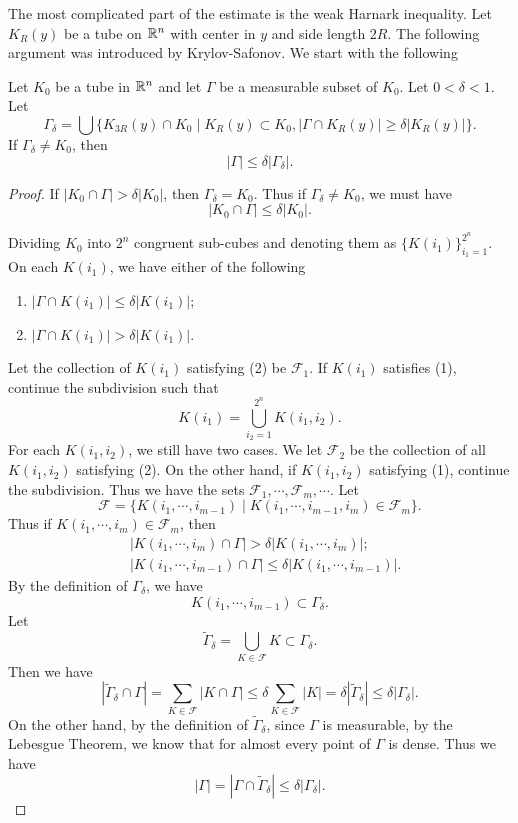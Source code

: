 The most complicated part of the estimate is the weak Harnark inequality. Let $K_R(y)$ be a tube on $\mathbb R^n$ with center in $y$ and side length $2R$. 
The following argument was introduced by Krylov-Safonov. We start  with the following




\begin{lemma}\label{20} Let $K_0$ be a tube in $\mathbb R^n$ and let $\Gamma$ be a measurable subset of $K_0$. Let $0<\delta<1$. Let
\[
\Gamma_\delta=\bigcup\{ K_{3R}(y)\cap K_0\mid K_R(y)\subset K_0, |\Gamma\cap K_R(y)|\geq\delta|K_R(y)|\}.
\]
If $\Gamma_\delta\neq K_0$, then
\[
|\Gamma|\leq\delta|\Gamma_\delta|.
\]
\end{lemma}

\begin{proof} If $|K_0\cap \Gamma|>\delta|K_0|$, then $\Gamma_\delta=K_0$. Thus if $\Gamma_\delta\neq K_0$, we must have
\[
|K_0\cap\Gamma|\leq\delta|K_0|.
\]

Dividing $K_0$ into $2^n$ congruent sub-cubes and denoting them as $\{K(i_1)\}_{i_1=1}^{2^n}$. On each $K(i_1)$, we have either of the following
\begin{enumerate}
\item $|\Gamma\cap K(i_1)|\leq\delta|K(i_1)|$;
\item $|\Gamma\cap K(i_1)|>\delta|K(i_1)|$.
\end{enumerate}
Let the collection of $K(i_1)$ satisfying (2) be $\mathcal F_1$. If $K(i_1)$ satisfies (1), continue the subdivision such that
\[
K(i_1)=\bigcup_{i_2=1}^{2^n}K(i_1,i_2).
\]
For each $K(i_1,i_2)$, we still have two cases. We let $\mathcal F_2$ be the collection of all $K(i_1,i_2)$ satisfying (2). On the other hand, if $K(i_1,i_2)$ satisfying (1), continue the subdivision. Thus we have the sets $\mathcal F_1,\cdots,\mathcal F_m,\cdots $. Let
\[
\mathcal F=\{K(i_1,\cdots,i_{m-1})\mid K(i_1,\cdots,i_{m-1}, i_m)\in\mathcal F_m\}.
\]
Thus if $K(i_1,\cdots,i_m)\in\mathcal F_m$, then
\begin{align*}
& |K(i_1,\cdots,i_m)\cap\Gamma|>\delta|K(i_1,\cdots,i_m)|;\\
&|K(i_1,\cdots,i_{m-1})\cap\Gamma|\leq \delta |K(i_1,\cdots,i_{m-1})|.
\end{align*}
By the definition of $\Gamma_\delta$, we have
\[
K(i_1,\cdots,i_{m-1})\subset\Gamma_\delta.
\]
Let
\[
\tilde\Gamma_\delta=\bigcup_{K\in\mathcal F} K\subset\Gamma_\delta.
\]
Then we have
\[
|\tilde\Gamma_\delta\cap\Gamma|=\sum_{K\in\mathcal F}|K\cap \Gamma|\leq\delta\sum_{K\in\mathcal F}|K|=\delta|\tilde\Gamma_\delta|\leq\delta|\Gamma_\delta|.
\]
On the other hand, by the definition of $\tilde\Gamma_\delta$, since  $\Gamma$ is measurable, by the Lebesgue Theorem, we know that for almost every point of $\Gamma$ is dense. Thus we have
\[
|\Gamma|=|\Gamma\cap\tilde\Gamma_\delta|\leq\delta|\Gamma_\delta|.
\]

\end{proof}

